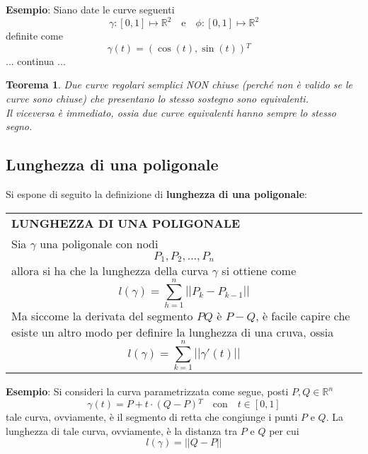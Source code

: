 \documentclass[a4paper]{extarticle}
\newtheorem{theorem}{Teorema}[section]
\renewcommand\arraystretch{}
\begin{document}
\vspace{2em}
\noindent
\textbf{Esempio}: Siano date le curve seguenti
\[\gamma : [0,1] \longmapsto \mathbb{R}^2 \hspace{1em} \text{e} \hspace{1em} \phi : [0,1] \longmapsto \mathbb{R}^2\]
definite come
\[\gamma(t) = \left(\cos(t), \sin(t)\right){^T} \hspace{1em}\]
... continua ...

\begin{theorem}
    Due curve regolari semplici NON chiuse (perché non è valido se le curve sono chiuse) che presentano lo stesso sostegno sono equivalenti.\\
    Il viceversa è immediato, ossia due curve equivalenti hanno sempre lo stesso segno.
\end{theorem}

\vspace{1em}
\subsection{Lunghezza di una poligonale}
Si espone di seguito la definizione di \textbf{lunghezza di una poligonale}:

\vspace{1em}
\setlength{\tabcolsep}{14pt}
\renewcommand{\arraystretch}{2}
\noindent
\begin{tabularx}{\textwidth}{@{}|P|@{}}
    \hline
    {\textbf{LUNGHEZZA DI UNA POLIGONALE}}\\
    \parbox{\linewidth}{Sia $\gamma$ una poligonale con nodi
    \[P_1,P_2,\dots,P_n\]
    allora si ha che la lunghezza della curva $\gamma$ si ottiene come
    \[l(\gamma) = \sum_{h=1}^{n} \left \vert \left \vert P_k - P_{k-1} \right \vert \right \vert\]
    Ma siccome la derivata del segmento $PQ$ è $P-Q$, è facile capire che esiste un altro modo per definire la lunghezza di una cruva, ossia
    \[l(\gamma) = \sum_{k=1}^{n} \left \vert \left \vert \gamma'(t) \right \vert \right \vert\]
    \vspace{-1mm}}\\
    \hline
\end{tabularx}

\vspace{2em}
\noindent
\textbf{Esempio}: Si consideri la curva parametrizzata come segue, posti $P,Q \in \mathbb{R}^n$
\[\gamma(t) = P + t \cdot (Q-P){^T} \hspace{1em} \text{con} \hspace{1em} t \in [0,1]\]
tale curva, ovviamente, è il segmento di retta che congiunge i punti $P$ e $Q$. La lunghezza di tale curva, ovviamente, è la distanza tra $P$ e $Q$ per cui
\[l(\gamma) = \vert \vert Q-P \vert \vert\]
\end{document}
